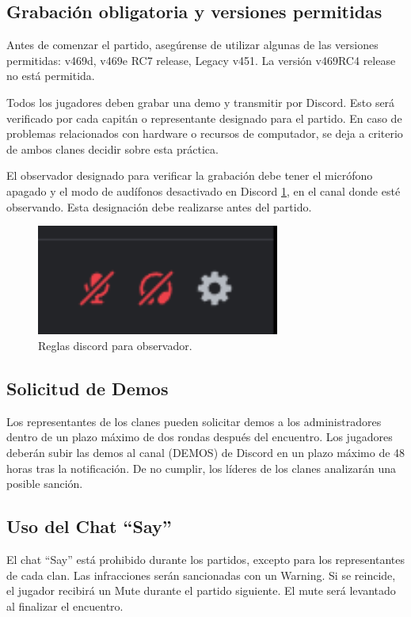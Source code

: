 \documentclass[a4paper, 11pt]{article}
\begin{document}
    \subsection{Grabación obligatoria y versiones permitidas}
    Antes de comenzar el partido, asegúrense de utilizar algunas de las versiones permitidas: v469d, v469e  RC7 release, Legacy v451. La versión v469RC4 release no está permitida.

Todos los jugadores deben grabar una demo y transmitir por Discord. Esto será verificado por cada capitán o representante designado para el partido. En caso de problemas relacionados con hardware o recursos de computador, se deja a criterio de ambos clanes decidir sobre esta práctica.

El observador designado para verificar la grabación debe tener el micrófono apagado y el modo de audífonos desactivado en Discord \ref{fig:discord}, en el canal donde esté observando. Esta designación debe realizarse antes del partido.

\begin{figure}[htb]
    \centering
    \includegraphics[width=8cm]{img/discord.png}
    \caption{Reglas discord para observador.}
    \label{fig:discord}
\end{figure} 

    \subsection{Solicitud de Demos}
    Los representantes de los clanes pueden solicitar demos a los administradores dentro de un plazo máximo de dos rondas después del encuentro. Los jugadores deberán subir las demos al canal (DEMOS) de Discord en un plazo máximo de 48 horas tras la notificación. De no cumplir, los líderes de los clanes analizarán una posible sanción.

    \subsection{Uso del Chat “Say”}
    El chat “Say” está prohibido durante los partidos, excepto para los representantes de cada clan. Las infracciones serán sancionadas con un Warning. Si se reincide, el jugador recibirá un Mute durante el partido siguiente. El mute será levantado al finalizar el encuentro.
\end{document}
